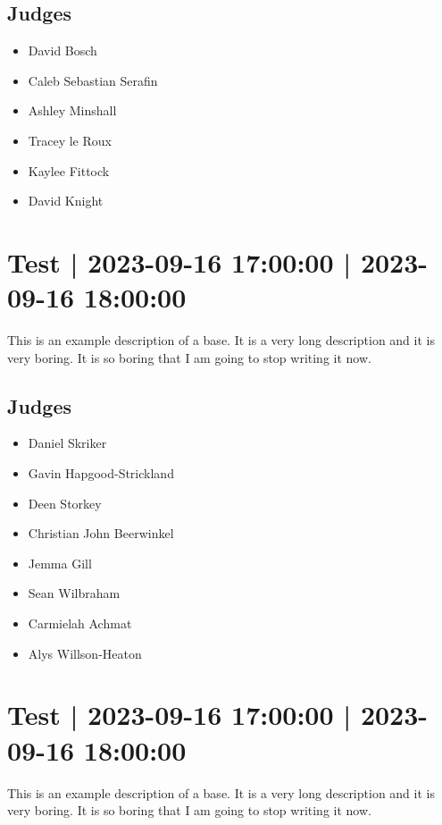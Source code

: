 \documentclass[10pt]{article}
\begin{document}
	\subsection*{Judges}
	\begin{itemize}

			\item David Bosch
			\item Caleb Sebastian Serafin
			\item Ashley Minshall
			\item Tracey le Roux
			\item Kaylee Fittock
			\item David Knight
		\end{itemize}

			\setcounter{section}{18}
	\section{Test | 2023-09-16 17:00:00 | 2023-09-16 18:00:00}
	This is an example description of a base. It is a very long description and it is very boring. It is so boring that I am going to stop writing it now.

	\subsection*{Judges}
	\begin{itemize}

			\item Daniel Skriker
			\item Gavin Hapgood-Strickland
			\item Deen Storkey
			\item Christian John Beerwinkel
			\item Jemma Gill
			\item Sean Wilbraham
			\item Carmielah Achmat
			\item Alys Willson-Heaton
		\end{itemize}

			\setcounter{section}{19}
	\section{Test | 2023-09-16 17:00:00 | 2023-09-16 18:00:00}
	This is an example description of a base. It is a very long description and it is very boring. It is so boring that I am going to stop writing it now.
\end{document}
